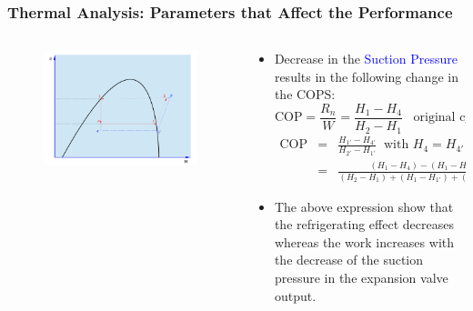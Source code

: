\documentclass[10pt,compress]{beamer}
\newcommand{\frc}{\displaystyle\frac}
\begin{document}
\begin{frame}
 \frametitle{Thermal Analysis: Parameters that Affect the Performance}
 \begin{columns}
  \begin{column}[c]{0.3\linewidth}
   \begin{figure}%
      \includegraphics[width=4.cm,height=4.cm,clip]{./Pics/Overview_Refrig20}
   \end{figure}  
  \end{column}  
  \begin{column}[c]{0.7\linewidth}
   \begin{itemize}
    \item <1-> Decrease in the \textcolor{blue}{Suction Pressure} results in the following change in the COPS:
     \begin{displaymath}
       \text{COP} = \frc{R_{n}}{W}=\frc{H_{1}-H_{4}}{H_{2}-H_{1}}\;\;\;\text{original cycle;}
     \end{displaymath}
     \begin{eqnarray}
      \text{COP}&=&\frc{H_{1'}-H_{4'}}{H_{2'}-H_{1'}}\;\;\text{with } H_{4}=H_{4'} \nonumber \\
                                  &=& \frc{\left(H_{1}-H_{4}\right)-\left(H_{1}-H_{1'}\right)}{\left(H_{2}-H_{1}\right)+\left(H_{1}-H_{1'}\right)+\left(H_{2'}-H_{2}\right)} \nonumber 
     \end{eqnarray} 
    \item <2-> The above expression show that the refrigerating effect decreases whereas the work increases with the decrease of the suction pressure in the expansion valve output.
   \end{itemize}
  \end{column}  
 \end{columns}
\end{frame}
\end{document}
